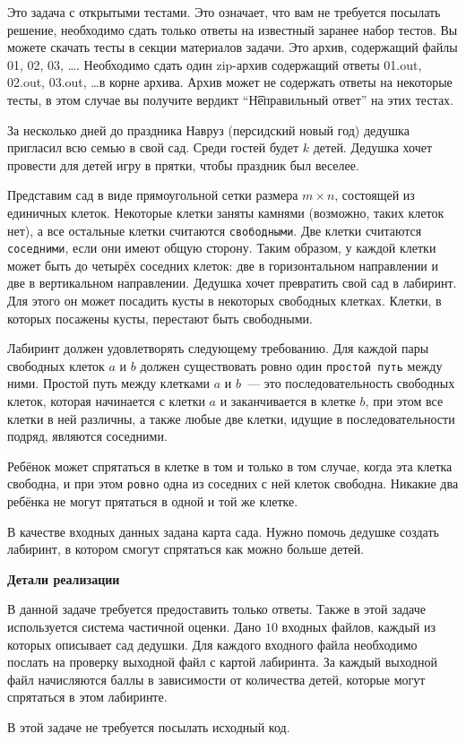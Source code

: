Это задача с открытыми тестами. Это означает, что вам не требуется посылать решение, необходимо сдать только ответы на известный заранее набор тестов. Вы можете скачать тесты в секции материалов задачи. Это архив, содержащий файлы 01, 02, 03, \dots. Необходимо сдать один zip-архив содержащий ответы 01.out, 02.out, 03.out, \dots в корне архива. Архив может не содержать ответы на некоторые тесты, в этом случае вы получите вердикт ``\t{Неправильный ответ}'' на этих тестах.

За несколько дней до праздника Навруз (персидский новый год) дедушка пригласил всю
семью в свой сад. Среди гостей будет $k$ детей. Дедушка хочет провести для детей игру в
прятки, чтобы праздник был веселее.

Представим сад в виде прямоугольной сетки размера $m \times n$, состоящей из единичных клеток. Некоторые клетки заняты камнями (возможно, таких клеток нет), а все остальные клетки считаются \texttt{свободными}. Две клетки считаются \texttt{соседними}, если они имеют общую сторону. Таким образом, у каждой клетки может быть до четырёх соседних клеток: две в горизонтальном направлении и две в вертикальном направлении. Дедушка хочет превратить свой сад в лабиринт. Для этого он может посадить кусты в некоторых свободных клетках. Клетки, в которых посажены кусты, перестают быть свободными.

Лабиринт должен удовлетворять следующему требованию. Для каждой пары свободных
клеток $a$ и $b$ должен существовать ровно один \texttt{простой путь} между ними. Простой путь между клетками $a$ и $b$~--- это последовательность свободных клеток, которая начинается с клетки $a$ и заканчивается в клетке $b$, при этом все клетки в ней различны, а также любые две клетки, идущие в последовательности подряд, являются соседними.

Ребёнок может спрятаться в клетке в том и только в том случае, когда эта клетка свободна, и при этом \texttt{ровно} одна из соседних с ней клеток свободна. Никакие два ребёнка не могут прятаться в одной и той же клетке.

В качестве входных данных задана карта сада. Нужно помочь дедушке создать лабиринт, в
котором смогут спрятаться как можно больше детей.

\textbf{Детали реализации}

В данной задаче требуется предоставить только ответы. Также в этой задаче используется
система частичной оценки. Дано $10$ входных файлов, каждый из которых описывает сад
дедушки. Для каждого входного файла необходимо послать на проверку выходной файл с
картой лабиринта. За каждый выходной файл начисляются баллы в зависимости от
количества детей, которые могут спрятаться в этом лабиринте.

В этой задаче не требуется посылать исходный код.




